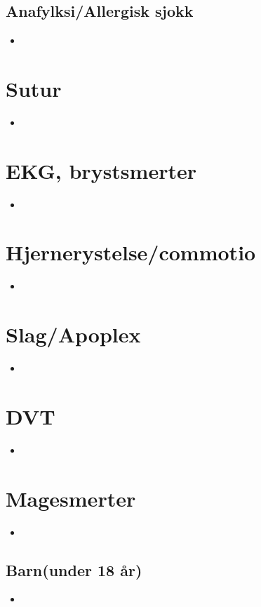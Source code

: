 \documentclass[12pt,a4paper]{memoir}
\begin{document}
		\subsection{Anafylksi/Allergisk sjokk}
			\begin{itemize}
				\item
			\end{itemize}
	\section{Sutur}
		\begin{itemize}
			\item
		\end{itemize}
	\section{EKG, brystsmerter}
		\begin{itemize}
			\item
		\end{itemize}
	\section{Hjernerystelse/commotio}
		\begin{itemize}
			\item
		\end{itemize}
	\section{Slag/Apoplex}
		\begin{itemize}
			\item
		\end{itemize}
	\section{DVT}
		\begin{itemize}
			\item
		\end{itemize}
	\section{Magesmerter}
		\begin{itemize}
			\item
		\end{itemize}
		\subsection{Barn(under 18 år)}
			\begin{itemize}
				\item
			\end{itemize}
\end{document}
